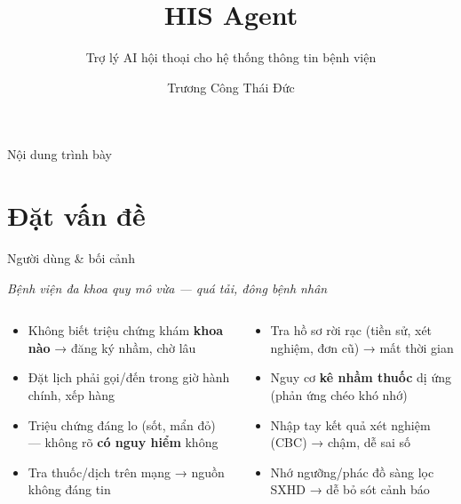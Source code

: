 \documentclass[aspectratio=169,t]{beamer}
\title{HIS Agent}
\subtitle{Trợ lý AI hội thoại cho hệ thống thông tin bệnh viện}
\author{Trương Công Thái Đức}
\institute{Đại học Bách Khoa Hà Nội\\GVHD: PGS.TS. Nguyễn Hồng Quang}
\begin{document}
\husttitlepage

\begin{frame}{Nội dung trình bày}
  \vspace{0.4cm}
  \tableofcontents
\end{frame}

\section{Đặt vấn đề}

\begin{frame}{Người dùng \& bối cảnh}
  \begin{center}\small\textit{Bệnh viện đa khoa quy mô vừa — quá tải, đông bệnh nhân}\end{center}
  \vspace{0.1cm}
  \begin{columns}[t]
      \begin{tcolorbox}[personacard, title={Bệnh nhân \normalfont\itshape\small— đi khám nhưng bối rối}]
        \begin{itemize}\setlength\itemsep{3pt}
          \item Không biết triệu chứng khám \textbf{khoa nào} → đăng ký nhầm, chờ lâu
          \item Đặt lịch phải gọi/đến trong giờ hành chính, xếp hàng
          \item Triệu chứng đáng lo (sốt, mẩn đỏ) — không rõ \textbf{có nguy hiểm} không
          \item Tra thuốc/dịch trên mạng → nguồn không đáng tin
        \end{itemize}
      \end{tcolorbox}
      \begin{tcolorbox}[personacard, title={Bác sĩ \normalfont\itshape\small— quá tải, dễ sai sót}]
        \begin{itemize}\setlength\itemsep{3pt}
          \item Tra hồ sơ rời rạc (tiền sử, xét nghiệm, đơn cũ) → mất thời gian
          \item Nguy cơ \textbf{kê nhầm thuốc} dị ứng (phản ứng chéo khó nhớ)
          \item Nhập tay kết quả xét nghiệm (CBC) → chậm, dễ sai số
          \item Nhớ ngưỡng/phác đồ sàng lọc SXHD → dễ bỏ sót cảnh báo
        \end{itemize}
      \end{tcolorbox}
  \end{columns}
\end{frame}
\end{document}
